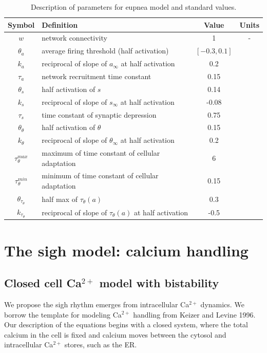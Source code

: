 \documentclass[12pt]{article}
\def\ca{Ca$^{2+}$\xspace}
\def\ainf{a_\infty}
\def\sinf{s_\infty}
\def\thetainf{\theta_\infty}
\def\tautheta{\tau_\theta}
\def\tauthetamax{\tau_\theta^{max}}
\def\tauthetamin{\tau_\theta^{min}}
\def\thetatheta{\theta_\theta}
\def\thetatautheta{\theta_{\tautheta}}
\def\ktautheta{k_{\tautheta}}
\begin{document}
\begin{table}[h!]
\centering 
\begin{tabular}{clcc}
    Symbol & Definition & Value  & Units \\
\hline 
\hline
$w$ & network connectivity & 1 &  - \\
\hline 
\hline 
$\theta_a$ & average firing threshold  (half activation) &  $[-0.3,0.1]$ & \\
$k_a$ & reciprocal of slope of $\ainf$ at half activation  & 0.2 &  \\
$\tau_a$ & network recruitment time constant  & 0.15  & \\
\hline 
$\theta_s$ & half activation of $s$ & 0.14 &  \\
$k_s$ & reciprocal of slope of $\sinf$ at half activation  & -0.08 &  \\
$\tau_s$ & time constant of synaptic depression   & 0.75 &  \\
\hline 
$\thetatheta$ & half activation of $\theta$ & 0.15 &  \\
$k_\theta$ & reciprocal of slope of $\thetainf$ at half activation  & 0.2 &  \\
\hline 
$\tauthetamax$ & maximum of time constant of cellular adaptation   & 6 &  \\
$\tauthetamin$ &  minimum of time constant of cellular adaptation   & 0.15 & \\
$\thetatautheta$ & half max of $\tautheta(a)$  & 0.3 &  \\
$\ktautheta$ & reciprocal of slope of $\tautheta(a)$ at half activation  & -0.5&   \\
    \hline 
    \hline
\end{tabular}
\caption{Description of parameters for eupnea model and standard values.}
\label{ParamDefEupnea}
\end{table}

\clearpage          
\section*{The sigh model: calcium handling}

\subsection*{Closed cell Ca$^{2+}$ model with bistability}

We propose the sigh rhythm emerges from intracellular Ca$^{2+}$ dynamics. We borrow the template for modeling \ca handling from Keizer and Levine 1996. Our description of the equations begins with a closed system, where the total calcium in the cell is fixed and calcium moves between the cytosol and intracellular \ca stores, such as the ER.
\end{document}
